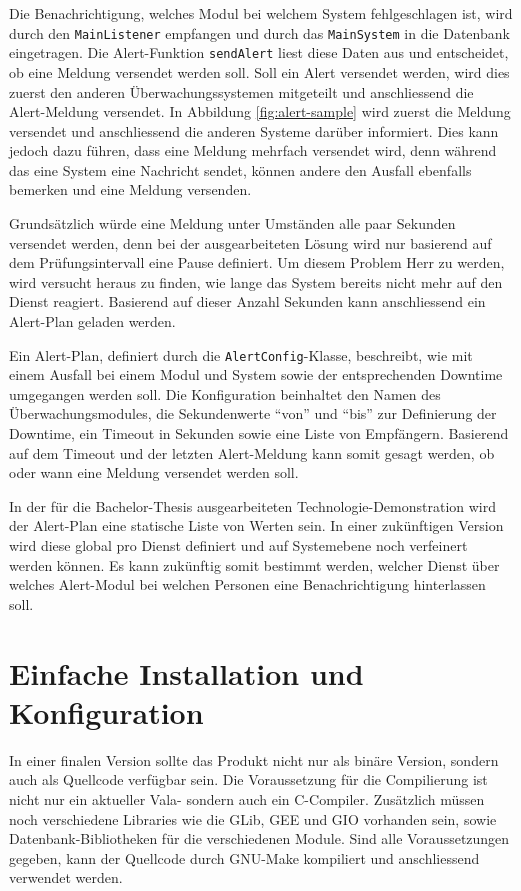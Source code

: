 Die Benachrichtigung, welches Modul bei welchem System fehlgeschlagen ist, wird durch den \texttt{MainListener} empfangen und durch das \texttt{MainSystem} in die Datenbank eingetragen. Die Alert-Funktion \texttt{sendAlert} liest diese Daten aus und entscheidet, ob eine Meldung versendet werden soll. Soll ein Alert versendet werden, wird dies zuerst den anderen \"Uberwachungssystemen mitgeteilt und anschliessend die Alert-Meldung versendet. In Abbildung \ref{fig:alert-sample} wird zuerst die Meldung versendet und anschliessend die anderen Systeme dar\"uber informiert. Dies kann jedoch dazu f\"uhren, dass eine Meldung mehrfach versendet wird, denn w\"ahrend das eine System eine Nachricht sendet, k\"onnen andere den Ausfall ebenfalls bemerken und eine Meldung versenden.

Grunds\"atzlich w\"urde eine Meldung unter Umst\"anden alle paar Sekunden versendet werden, denn bei der ausgearbeiteten L\"osung wird nur basierend auf dem Pr\"ufungsintervall eine Pause definiert. Um diesem Problem Herr zu werden, wird versucht heraus zu finden, wie lange das System bereits nicht mehr auf den Dienst reagiert. Basierend auf dieser Anzahl Sekunden kann anschliessend ein Alert-Plan geladen werden.

Ein Alert-Plan, definiert durch die \texttt{AlertConfig}-Klasse, beschreibt, wie mit einem Ausfall bei einem Modul und System sowie der entsprechenden Downtime umgegangen werden soll. Die Konfiguration beinhaltet den Namen des \"Uberwachungsmodules, die Sekundenwerte "`von"' und "`bis"' zur Definierung der Downtime, ein Timeout in Sekunden sowie eine Liste von Empf\"angern. Basierend auf dem Timeout und der letzten Alert-Meldung kann somit gesagt werden, ob oder wann eine Meldung versendet werden soll.

In der f\"ur die Bachelor-Thesis ausgearbeiteten Technologie-Demonstration wird der Alert-Plan eine statische Liste von Werten sein. In einer zuk\"unftigen Version wird diese global pro Dienst definiert und auf Systemebene noch verfeinert werden k\"onnen. Es kann zuk\"unftig somit bestimmt werden, welcher Dienst \"uber welches Alert-Modul bei welchen Personen eine Benachrichtigung hinterlassen soll.


\section{Einfache Installation und Konfiguration} \label{sec:praxis-install}
In einer finalen Version sollte das Produkt nicht nur als bin\"are Version, sondern auch als Quellcode verf\"ugbar sein. Die Voraussetzung f\"ur die Compilierung ist nicht nur ein aktueller Vala- sondern auch ein C-Compiler. Zus\"atzlich m\"ussen noch verschiedene Libraries wie die GLib, GEE und GIO vorhanden sein, sowie Datenbank-Bibliotheken f\"ur die verschiedenen Module. Sind alle Voraussetzungen gegeben, kann der Quellcode durch GNU-Make kompiliert und anschliessend verwendet werden.

